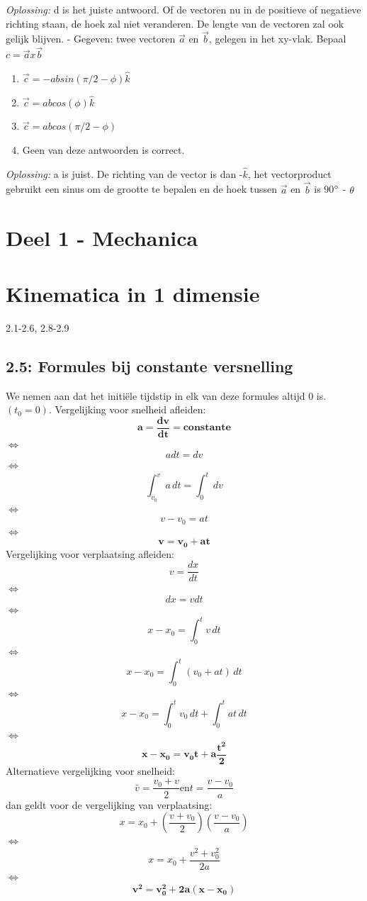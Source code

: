 \documentclass[12pt,a4paper]{article}
\begin{document}
	\textit{Oplossing:} d is het juiste antwoord. Of de vectoren nu in de positieve of negatieve richting staan, de hoek zal niet veranderen. De lengte van de vectoren zal ook gelijk blijven.
	\newline
	- Gegeven: twee vectoren $\overrightarrow{a}$ en $\overrightarrow{b}$, gelegen in het xy-vlak. Bepaal \(c = \overrightarrow{a} x \overrightarrow{b}\)
	\begin{enumerate}[label=\alph*)]
		\item \(\overrightarrow{c} = - ab sin(\pi/2 - \phi)\hat{k}\)
		\item \(\overrightarrow{c} = abcos(\phi)\hat{k}\)
		\item \(\overrightarrow{c} = abcos(\pi/2 - \phi)\)
		\item Geen van deze antwoorden is correct. 
	\end{enumerate}
	\textit{Oplossing:} a is juist. De richting van de vector is dan -$\hat{k}$, het vectorproduct gebruikt een sinus om de grootte te bepalen en de hoek tussen $\overrightarrow{a}$ en $\overrightarrow{b}$ is 90$\degree$ - $\theta$
	\newpage
	\section{Deel 1 - Mechanica}
	\section{Kinematica in 1 dimensie}
	2.1-2.6, 2.8-2.9
	\subsection{2.5: Formules bij constante versnelling}
	We nemen aan dat het initiële tijdstip in elk van deze formules altijd 0 is. \((t_{0} = 0)\).
	Vergelijking voor snelheid afleiden: 
	\[\mathbf{a = \frac{dv}{dt} = constante}\]
	$\iff$ \[a dt = dv\]
	$\iff$ \[\int_{v_0}^{v} a \, dt = \int_{0}^{t} \,dv\]
	$\iff$\[v - v_0 = at\]
	$\iff$\[\mathbf{v = v_0 + at}\]
	Vergelijking voor verplaatsing afleiden: 
	\[v = \frac{dx}{dt}\]
	$\iff$\[dx = v dt\]
	$\iff$\[x - x_0 = \int_{0}^{t} v \, dt\]
	$\iff$\[x - x_0 = \int_{0}^{t} (v_0 + at) \, dt\]
	$\iff$\[x - x_0 = \int_{0}^{t} v_0 \, dt + \int_{0}^{t} at \, dt\]
	$\iff$\[\mathbf{x - x_0 = v_0t + a\frac{t^2}{2}}\]
	Alternatieve vergelijking voor snelheid: 
	\[\bar{v} = \frac{v_0 + v}{2} \text{en} t = \frac{v - v_0}{a}\]
	dan geldt voor de vergelijking van verplaatsing: 
	\[x = x_0 + (\frac{v + v_0}{2})(\frac{v - v_0}{a})\]
	$\iff$\[x = x_0 + \frac{v^2 + v_0^2}{2a}\]
	$\iff$\[\mathbf{v^2 = v_0^2 + 2a(x - x_0)}\]
\end{document}
